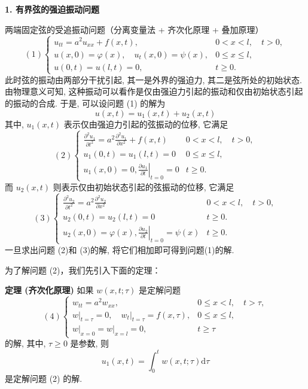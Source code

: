 \textbf{1. 有界弦的强迫振动问题}

两端固定弦的受追振动问题（分离变量法 + 齐次化原理 + 叠加原理）
$$
(1)\left\{\begin{array}{ll}
u_{t t}=a^{2} u_{x x}+f(x, t), & 0<x<l, \quad t>0, \\
u(x, 0)=\varphi(x), \quad u_{t}(x, 0)=\psi(x), & 0 \leqslant x \leqslant l, \\
u(0, t)=u(l, t)=0, & t \geqslant 0 .
\end{array}\right.
$$
此时弦的振动由两部分干扰引起, 其一是外界的强迫力, 其二是弦所处的初始状态. 由物理意义可知, 这种振动可以看作是仅由强迫力引起的振动和仅由初始状态引起的振动的合成. 于是, 可以设问题 (1) 的解为
$$
u(x, t)=u_1(x, t)+u_2(x, t)
$$
其中, $ u_1(x, t) $ 表示仅由强迫力引起的弦振动的位移, 它满足
$$
(2)\left\{\begin{array}{ll}
\frac{\partial^{2} u_1}{\partial t^{2}}=a^{2} \frac{\partial^{2} u_1}{\partial x^{2}}+f(x, t) & 0<x<l, \quad t>0,\\
u_1(0, t)=u_1(l, t)=0 & 0 \leqslant x \leqslant l,\\
u_1(x, 0)=0,\left.\frac{\partial u_1}{\partial t}\right|_{t=0}=0 & t \geqslant 0 .
\end{array}\right.
$$
而 $ u_2(x, t) $ 则表示仅由初始状态引起的弦振动的位移, 它满足
$$
(3)\left\{\begin{array}{ll}
\frac{\partial^{2} u_2}{\partial t^{2}}=a^{2} \frac{\partial^{2} u_2}{\partial x^{2}} & 0<x<l, \quad t>0,\\
u_2(0, t)=u_2(l, t)=0 & t \geqslant 0 .\\
u_2(x, 0)=\varphi(x),\left.\frac{\partial u_2}{\partial t}\right|_{t=0}=\psi(x)& t \geqslant 0 .
\end{array}\right.
$$
 一旦求出问题 (2)和 (3)的解, 将它们相加即可得到问题(1)的解.

为了解问题 (2)，我们先引入下面的定理：

\textbf{定理  (齐次化原理) }如果 $ w(x, t ; \tau) $ 是定解问题
$$
(4)\left\{\begin{array}{ll}
w_{t t}=a^{2} w_{x x}, & 0 \leqslant x<l, \quad t>\tau, \\
\left.w\right|_{t=\tau}=0,\left.\quad w_{t}\right|_{t=\tau}=f(x, \tau), & 0 \leqslant x \leqslant l, \\
\left.w\right|_{x=0}=\left.w\right|_{x=l}=0, & t \geqslant \tau
\end{array}\right.
$$
的解, 其中, $ \tau \geqslant 0 $ 是参数, 则
$$
u_{1}(x, t)=\int_{0}^{t} w(x, t ; \tau) \mathrm{d} \tau
$$
是定解问题 (2) 的解.


